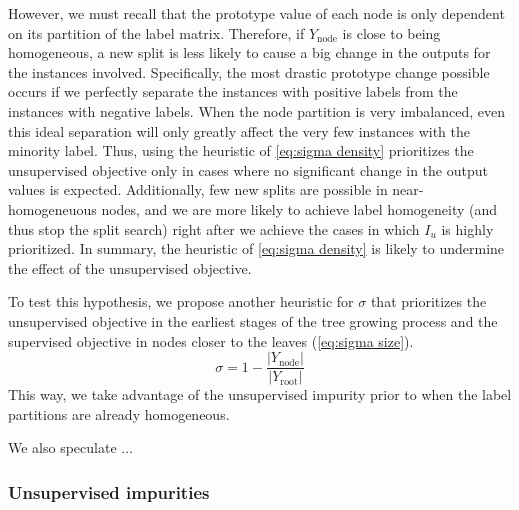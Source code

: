 However, we must recall that the prototype value of each node is only dependent on its partition of the label matrix. Therefore, if $Y_\text{node}$ is close to being homogeneous, a new split is less likely to cause a big change in the outputs for the instances involved. Specifically, the most drastic prototype change possible occurs if we perfectly separate the instances with positive labels from the instances with negative labels.
When the node partition is very imbalanced, even this ideal separation will only greatly affect the very few instances with the minority label. Thus, using the heuristic of \autoref{eq:sigma density} prioritizes the unsupervised objective only in cases where no significant change in the output values is expected. Additionally, few new splits are possible in near-homogeneuous nodes, and we are more likely to achieve label homogeneity (and thus stop the split search) right after we achieve the cases in which $I_u$ is highly prioritized. In summary, the heuristic of \autoref{eq:sigma density} is likely to undermine the effect of the unsupervised objective.


To test this hypothesis, we propose another heuristic for $\sigma$ that prioritizes the unsupervised objective in the earliest stages of the tree growing process and the supervised objective in nodes closer to the leaves (\autoref{eq:sigma size}).
%
\begin{equation}
    \sigma = 1 - \frac{|Y_\text{node}|}{|Y_\text{root}|}
    \label{eq:sigma size}
\end{equation}
%
This way, we take advantage of the unsupervised impurity prior to when the label partitions are already homogeneous.

We also speculate ... %






\subsubsection{Unsupervised impurities}
\label{sec:Iu}

